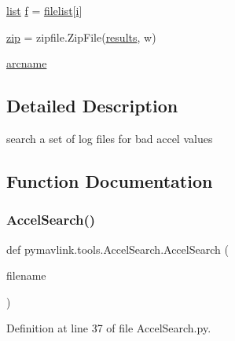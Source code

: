 \begin{DoxyCompactItemize}
\item 
\mbox{\hyperlink{structlist}{list}} \mbox{\hyperlink{namespacepymavlink_1_1tools_1_1AccelSearch_a2127731e1cc2c0698014708e428ffc5e}{f}} = \mbox{\hyperlink{namespacepymavlink_1_1tools_1_1AccelSearch_ab9d70abda8675fc388a6a5dd64e15911}{filelist}}\mbox{[}\mbox{\hyperlink{velTest_8cpp_a1239420b8759f52cbab64225b82461e2}{i}}\mbox{]}
\item 
\mbox{\hyperlink{namespacepymavlink_1_1tools_1_1AccelSearch_a6ef693fa8c321379c8d76e4146d4ca27}{zip}} = zipfile.\+Zip\+File(\mbox{\hyperlink{namespacepymavlink_1_1tools_1_1AccelSearch_a9a479651d64962eb0d1d91b8e0508a30}{results}}, \textquotesingle{}w\textquotesingle{})
\item 
\mbox{\hyperlink{namespacepymavlink_1_1tools_1_1AccelSearch_ad4e01754352be7eae43c865e659e8468}{arcname}}
\end{DoxyCompactItemize}


\subsection{Detailed Description}
\begin{DoxyVerb}search a set of log files for bad accel values
\end{DoxyVerb}
 

\subsection{Function Documentation}
\mbox{\label{namespacepymavlink_1_1tools_1_1AccelSearch_a20e68a37811b32e425149b7751a0180b}} 
\subsubsection{\texorpdfstring{AccelSearch()}{AccelSearch()}}
{\footnotesize\ttfamily def pymavlink.\+tools.\+Accel\+Search.\+Accel\+Search (\begin{DoxyParamCaption}\item[{}]{filename }\end{DoxyParamCaption})}



Definition at line 37 of file Accel\+Search.\+py.



